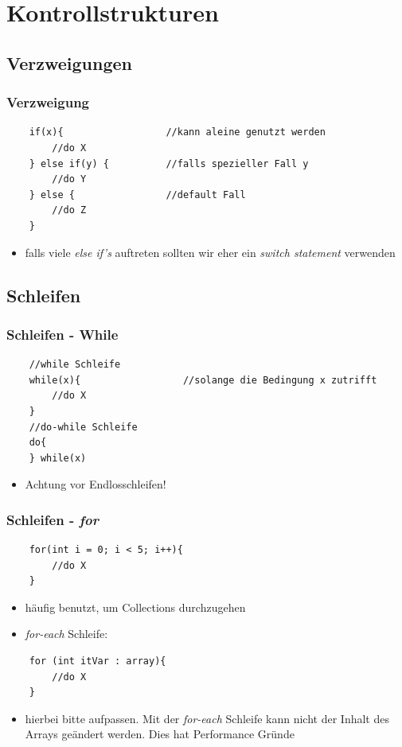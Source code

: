 \section{Kontrollstrukturen}
\subsection{Verzweigungen}
\begin{frame}[fragile]
\frametitle{Verzweigung}
\begin{lstlisting}
    if(x){                  //kann aleine genutzt werden
        //do X              
    } else if(y) {          //falls spezieller Fall y
        //do Y
    } else {                //default Fall
        //do Z
    }
\end{lstlisting}
\begin{itemize}
    \item falls viele \textit{else if's} auftreten sollten wir eher ein \textit{switch statement} verwenden
\end{itemize}

\end{frame}

\subsection{Schleifen}

\begin{frame}[fragile]
\frametitle{Schleifen - While}
\begin{lstlisting}
    //while Schleife
    while(x){                  //solange die Bedingung x zutrifft
        //do X              
    } 
    //do-while Schleife
    do{                        
    } while(x)
\end{lstlisting}
\begin{itemize}
    \item Achtung vor Endlosschleifen!
\end{itemize}
\end{frame}

\begin{frame}[fragile]
\frametitle{Schleifen - \textit{for}}
\begin{lstlisting}
    for(int i = 0; i < 5; i++){
        //do X
    }
\end{lstlisting}
\begin{itemize}
    \item häufig benutzt, um Collections durchzugehen
    \item \textit{for-each} Schleife:
\end{itemize}
\begin{lstlisting}
    for (int itVar : array){
        //do X
    }
\end{lstlisting}
\begin{itemize}
    \item hierbei bitte aufpassen. Mit der \textit{for-each} Schleife kann nicht der Inhalt des Arrays geändert werden. Dies hat Performance Gründe
\end{itemize}
\end{frame}

